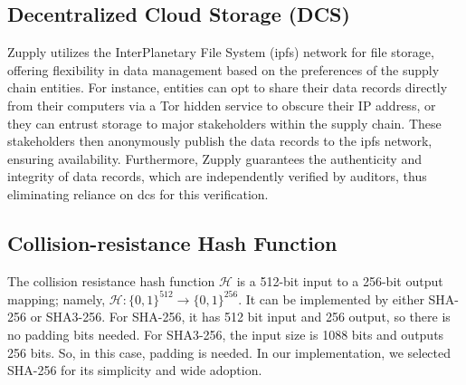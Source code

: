 \subsection{Decentralized Cloud Storage (DCS)}

Zupply utilizes the 
InterPlanetary File System
(\gls{ipfs}) network \cite{Benet2014} for file storage, offering flexibility in data management based on the preferences of the supply chain entities. For instance, entities can opt to share their data records directly from their computers via a Tor hidden service \cite{Loshin2013PracticalAnonymity} to obscure their IP address, or they can entrust storage to major stakeholders within the supply chain. These stakeholders then anonymously publish the data records to the \gls{ipfs} network, ensuring availability. Furthermore, Zupply guarantees the authenticity and integrity of data records, which are independently verified by auditors, thus eliminating reliance on \gls{dcs} for this verification. 




 



\subsection{Collision-resistance Hash Function}

The collision resistance hash function $\mathcal{H}$ is a 512-bit input to a 256-bit output mapping; namely, $\mathcal{H}:\{0,1\}^{512} \rightarrow \{0,1\}^{256}$. It can be implemented by either SHA-256 or SHA3-256. For SHA-256, it has 512 bit input and 256 output, so there is no padding bits needed. For SHA3-256, the input size is 1088 bits  and outputs 256 bits. So, in this case, padding is needed. In our implementation, we selected SHA-256 for its simplicity and wide adoption.  

